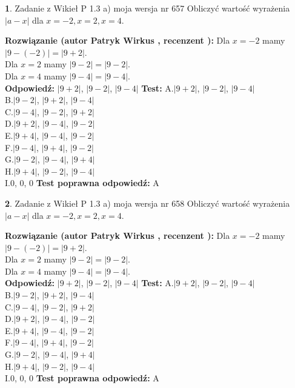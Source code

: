 \documentclass[12pt, a4paper]{article}
\theoremstyle{definition} %
\newtheorem{zad}{}
\newcommand{\zadStart}[1]{\begin{zad}#1\newline}
\newcommand{\zadStop}{\end{zad}}
\newcommand{\rozwStart}[2]{\noindent \textbf{Rozwiązanie (autor #1 , recenzent #2): }\newline}
\newcommand{\rozwStop}{\newline}
\newcommand{\odpStart}{\noindent \textbf{Odpowiedź:}\newline}
\newcommand{\odpStop}{\newline}
\newcommand{\testStart}{\noindent \textbf{Test:}\newline}
\newcommand{\testStop}{\newline}
\newcommand{\kluczStart}{\noindent \textbf{Test poprawna odpowiedź:}\newline}
\newcommand{\kluczStop}{\newline}
\begin{document}
\zadStart{Zadanie z Wikieł P 1.3 a) moja wersja nr 657}
Obliczyć wartość wyrażenia $|a - x|$ dla $x=-2,x=2,x=4$.
\zadStop
\rozwStart{Patryk Wirkus}{}
Dla $x = -2$ mamy $|9 - (-2)| = |9 + 2|$.\\
Dla $x = 2$ mamy $|9 - 2| = |9 - 2|$.\\
Dla $x = 4$ mamy $|9 - 4| = |9 - 4|$.\\
\rozwStop
\odpStart
$|9 + 2|$, $|9 - 2|$, $|9 - 4|$
\odpStop
\testStart
A.$|9 + 2|$, $|9 - 2|$, $|9 - 4|$\\
B.$|9 - 2|$, $|9 + 2|$, $|9 - 4|$\\
C.$|9 - 4|$, $|9 - 2|$, $|9 + 2|$\\
D.$|9 + 2|$, $|9 - 4|$, $|9 - 2|$\\
E.$|9 + 4|$, $|9 - 4|$, $|9 - 2|$\\
F.$|9 - 4|$, $|9 + 4|$, $|9 - 2|$\\
G.$|9 - 2|$, $|9 - 4|$, $|9 + 4|$\\
H.$|9 + 4|$, $|9 - 2|$, $|9 - 4|$\\
I.$0$, $0$, $0$
\testStop
\kluczStart
A
\kluczStop



\zadStart{Zadanie z Wikieł P 1.3 a) moja wersja nr 658}
Obliczyć wartość wyrażenia $|a - x|$ dla $x=-2,x=2,x=4$.
\zadStop
\rozwStart{Patryk Wirkus}{}
Dla $x = -2$ mamy $|9 - (-2)| = |9 + 2|$.\\
Dla $x = 2$ mamy $|9 - 2| = |9 - 2|$.\\
Dla $x = 4$ mamy $|9 - 4| = |9 - 4|$.\\
\rozwStop
\odpStart
$|9 + 2|$, $|9 - 2|$, $|9 - 4|$
\odpStop
\testStart
A.$|9 + 2|$, $|9 - 2|$, $|9 - 4|$\\
B.$|9 - 2|$, $|9 + 2|$, $|9 - 4|$\\
C.$|9 - 4|$, $|9 - 2|$, $|9 + 2|$\\
D.$|9 + 2|$, $|9 - 4|$, $|9 - 2|$\\
E.$|9 + 4|$, $|9 - 4|$, $|9 - 2|$\\
F.$|9 - 4|$, $|9 + 4|$, $|9 - 2|$\\
G.$|9 - 2|$, $|9 - 4|$, $|9 + 4|$\\
H.$|9 + 4|$, $|9 - 2|$, $|9 - 4|$\\
I.$0$, $0$, $0$
\testStop
\kluczStart
A
\kluczStop
\end{document}
